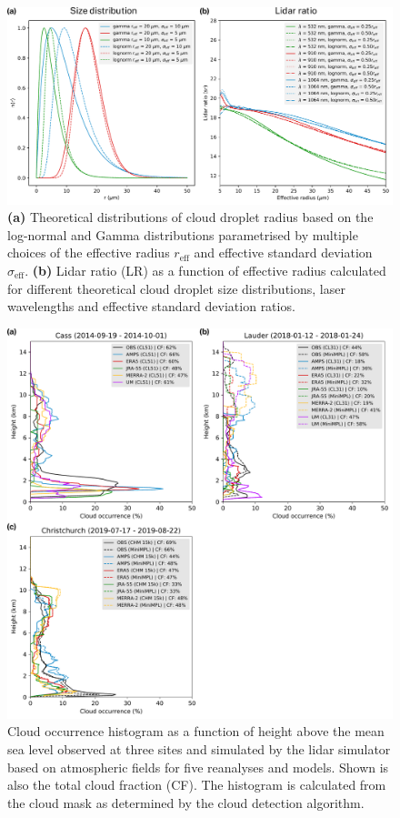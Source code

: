 \begin{figure}[t]
\centering
\includegraphics[width=\textwidth]{chapter3/fig/size_dist.pdf}
\caption[Theoretical distributions of cloud droplet radius]{
\textbf{(a)} Theoretical distributions of cloud droplet radius based on
the log-normal and Gamma distributions parametrised
by multiple choices of the effective radius $r_\text{eff}$ and effective standard deviation
$\sigma_\text{eff}$. \textbf{(b)} Lidar ratio (LR) as a function of effective
radius calculated for different theoretical cloud droplet size
distributions, laser wavelengths and effective standard deviation ratios.
}
\label{fig:size-dist}
\end{figure}

\clearpage

\begin{figure}[t]
\centering
\includegraphics[width=\textwidth]{chapter3/fig/case_studies.pdf}
\caption[Cloud occurrence histogram as a function of height]{
Cloud occurrence histogram as a function of height above the mean sea level
observed at three sites and simulated by the lidar simulator based on atmospheric
fields for five reanalyses and models. Shown is also the total cloud fraction (CF).
The histogram is calculated from the cloud mask as determined by the cloud
detection algorithm.
}
\label{fig:case-studies}
\end{figure}

